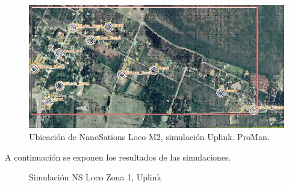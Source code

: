 \documentclass[12pt,a4paper]{book}
\begin{document}
\begin{figure} [H]
\centering
\includegraphics[width= 15cm]{../figuras/Ubicacion_NSLoco.JPG}

\caption{Ubicación de NanoSations Loco M2, simulación Uplink. ProMan.}
\label{fig_Ubicacion_Nano}
\end{figure}

A continuación se exponen los resultados de las simulaciones.

\begin{figure}[H]
\centering
{} 
\caption{Simulación NS Loco Zona 1, Uplink}
\label{fig_SimulLoco1_acceso}
\end{figure}
\end{document}
